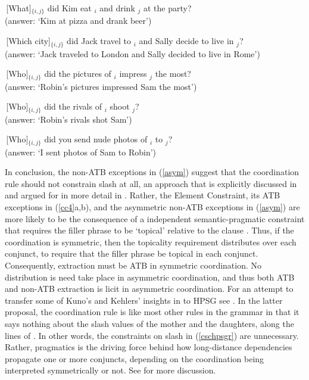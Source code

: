 \documentclass[output=paper]{langsci/langscibook}
\begin{document}
\ea \label{cumulative}
\ea
\,[What]$_{\lbrace i,j \rbrace}$ did Kim eat \spc$_i$ and drink \spc$_j$ at the party?\\
(answer: `Kim at pizza and drank beer')
\item \,[Which city]$_{\lbrace i,j \rbrace}$ did Jack travel to \spc$_i$ and Sally decide to live in \spc$_j$?\\
(answer: `Jack traveled to London and Sally decided to live in Rome')
\item \,[Who]$_{\lbrace i,j \rbrace}$ did the pictures of \spc$_i$ impress \spc$_j$ the most?\\
(answer: `Robin's pictures impressed Sam the most')
\item \,[Who]$_{\lbrace i,j \rbrace}$ did the rivals of \spc$_i$ shoot \spc$_j$?\\
(answer: `Robin's rivals shot Sam')
\item \,[Who]$_{\lbrace i,j \rbrace}$ did you send nude photos of \spc$_i$ to \spc$_j$?\\
(answer: `I sent photos of Sam to Robin')
\z
\z

In conclusion, the  non-ATB exceptions in (\ref{asym}) suggest that the coordination rule should not constrain {\sc slash} at all, an approach that is explicitly discussed in \citep[203]{pollardsag} and
argued for in more detail in \citet{chaves}.  Rather,  the Element Constraint, its ATB exceptions in (\ref{cc4}a,b), and the asymmetric non-ATB exceptions in (\ref{asym}) are more likely to be the consequence of a independent semantic-pragmatic constraint that requires the filler phrase to be `topical'  relative to the clause \citep{lakoff86,kuno87,kehler,kubotalee}. Thus, if the coordination is  symmetric, then the topicality requirement  distributes over each conjunct, to require that the  filler phrase be topical in each conjunct. Consequently, extraction must
be ATB in symmetric coordination. No distribution is need take place in asymmetric coordination, and thus both 
ATB and non-ATB extraction is licit in asymmetric coordination. For an attempt to transfer
some of Kuno's and Kehlers' insights in to HPSG  see \citet{chaves}. In the latter proposal,
 the coordination rule is like most other rules in the grammar in that it says nothing about
the {\sc slash} values of the mother and the daughters, along the lines of 
\citet[354]{levhubook}. In other words, the constraints on {\sc slash} in (\ref{cschpsgr}) are unnecessary.  Rather, pragmatics is the driving force behind how  long-distance dependencies propagate one or more conjuncts, depending on the coordination being interpreted symmetrically or not. 
See  for more discussion.
\end{document}
